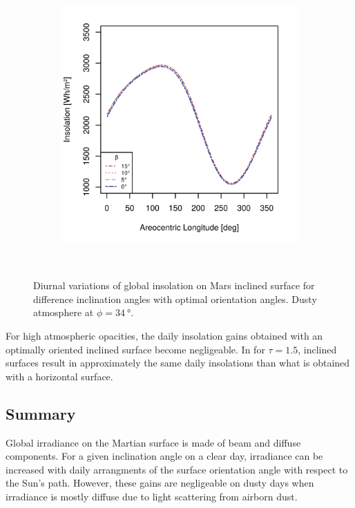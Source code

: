 \begin{figure}[h]
\begin{subfigure}[t]{\subfigureWidth}
            \includegraphics[height=\graphicsHeight]{sections/mars-solar-energy/solar-radiation/plots/ismenius-cavus-solar-insolations-for-different-beta-inclinations-at-tau-factor-15.png}
            \label{fig:plot:sub:diurnal-insolation-variations-inclined-surface-tau-1p5}
    \end{subfigure}\\[0.8ex]
    \caption[Diurnal insolation variations on Mars inclined surface]
    {Diurnal variations of global insolation on Mars inclined surface for difference inclination angles with optimal orientation angles. Dusty atmosphere at $\phi = \SI{34}{\degree}.$}
    \label{fig:plot:diurnal-insolation-variations-inclined-surface}
\vspace{-2ex}
\end{figure}

\vspace{0.2cm}

For high atmospheric opacities, the daily insolation gains obtained with an optimally oriented inclined surface become negligeable. In  for $\tau = 1.5$, inclined surfaces result in approximately the same daily insolations than what is obtained with a horizontal surface.


\subsection{Summary}
Global irradiance on the Martian surface is made of beam and diffuse components. For a given inclination angle on a clear day, irradiance can be increased with daily arrangments of the surface orientation angle with respect to the Sun's path. However, these gains are negligeable on dusty days when irradiance is mostly diffuse due to light scattering from airborn dust.

